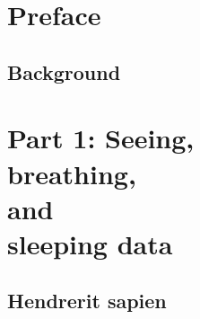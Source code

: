 \usepackage{lipsum}




\coverpage{\TITLE}{\SUBTITLE}{\AUTHOR}{\DATE}{\SUBJECT}
\newpage
\tableofcontents

\part{Preface}
\newpage
\chapter{Background} \label{ch:lorem}


\part{Part 1: Seeing, \\breathing, \\and \\sleeping data}
\newpage
\chapter{Hendrerit sapien} \label{ch:hendrerit}

\newpage


